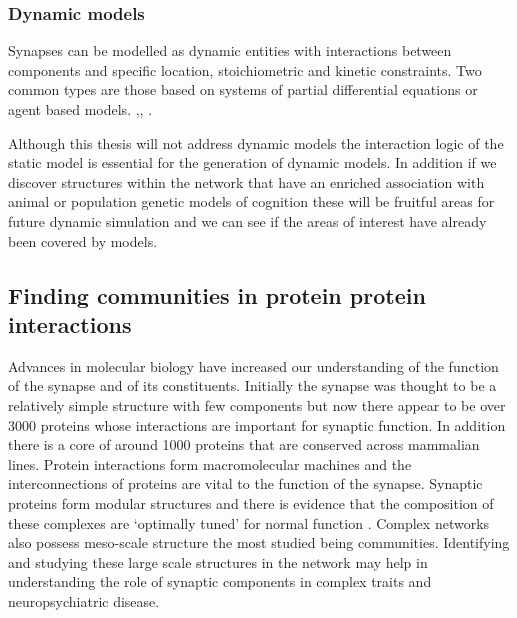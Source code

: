 \subsubsection{Dynamic models}

Synapses can be modelled as dynamic entities with interactions between components and specific location, stoichiometric and kinetic constraints. Two common types are those based on systems of partial differential equations or agent based models. \cite{sorokina2013simulator},\cite{sorokin2014rkappa}, \cite{walpole2013multiscale}.

Although this thesis will not address dynamic models the interaction logic of the static model is essential for the generation of dynamic models. In addition if we discover structures within the network that have an enriched association with animal or population genetic models of cognition these will be fruitful areas for future dynamic simulation and we can see if the areas of interest have already been covered by models. 

\subsection{Finding communities in protein protein interactions}
\label{sec:Introduction finding communities in protein protein interactions}
Advances in molecular biology have increased our understanding of the function of the synapse and of its constituents. Initially the synapse was thought to be a relatively simple structure with few components but now there appear to be over 3000 proteins whose interactions are important for synaptic function. In addition there is a core of around 1000 proteins that are conserved across mammalian lines.  Protein interactions form macromolecular machines and the interconnections of proteins are vital to the function of the synapse. 
Synaptic proteins form modular structures \cite{pocklington2006proteomes} and there is evidence that the composition of these complexes are ‘optimally tuned’ for normal function \cite{grant2012synaptopathies}. Complex networks also possess meso-scale structure the most studied being communities. Identifying and studying these large scale structures in the network may help in understanding the role of synaptic components in complex traits and neuropsychiatric disease.





